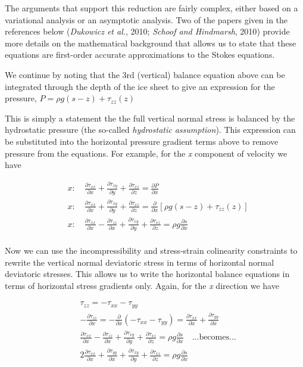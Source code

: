 The arguments that support this reduction are fairly complex, either based on a variational analysis or an asymptotic analysis. Two of the papers given in the references below ({\textit{Dukowicz et al.}, 2010}; {\textit{Schoof and Hindmarsh}, 2010}) provide more details on the mathematical background that allows us to state that these equations are first-order accurate approximations to the Stokes equations. 

We continue by noting that the 3rd (vertical) balance equation above can be integrated through the depth of the ice sheet to give an expression for the pressure, $P=\rho g\left( s-z \right)+\tau _{zz}(z)$

This is simply a statement the the full vertical normal stress is balanced by the hydrostatic pressure (the so-called \textit{hydrostatic assumption}). This expression can be substituted into the horizontal pressure gradient terms above to remove pressure from the equations. For example, for the \textit{x} component of velocity we have

\begin{align*}
  & x:\quad \frac{\partial \tau _{xx}}{\partial x}+\frac{\partial \tau _{xy}}{\partial y}+\frac{\partial \tau _{xz}}{\partial z}=\frac{\partial P}{\partial x} \\ 
 & x:\quad \frac{\partial \tau _{xx}}{\partial x}+\frac{\partial \tau _{xy}}{\partial y}+\frac{\partial \tau _{xz}}{\partial z}=\frac{\partial }{\partial x}\left[ \rho g\left( s-z \right)+\tau _{zz}(z) \right] \\ 
 & x:\quad \frac{\partial \tau _{xx}}{\partial x}-\frac{\partial \tau _{zz}}{\partial x}+\frac{\partial \tau _{xy}}{\partial y}+\frac{\partial \tau _{xz}}{\partial z}=\rho g\frac{\partial s}{\partial x} \\ 
\end{align*}

Now we can use the incompressibility and stress-strain colinearity constraints to rewrite the vertical normal deviatoric stress in terms of horizontal normal deviatoric stresses. This allows us to write the horizontal balance equations in terms of horizontal stress gradients only. Again, for the \textit{x} direction we have

\begin{align*}
  & \tau _{zz}=-\tau _{xx}-\tau _{yy} \\ 
 & -\frac{\partial \tau _{zz}}{\partial x}=-\frac{\partial }{\partial x}\left( -\tau _{xx}-\tau _{yy} \right)=\frac{\partial \tau _{xx}}{\partial x}+\frac{\partial \tau _{yy}}{\partial x} \\ 
 & \frac{\partial \tau _{xx}}{\partial x}-\frac{\partial \tau _{zz}}{\partial x}+\frac{\partial \tau _{xy}}{\partial y}+\frac{\partial \tau _{xz}}{\partial z}=\rho g\frac{\partial s}{\partial x}\quad ...\text{becomes}... \\ 
 & 2\frac{\partial \tau _{xx}}{\partial x}+\frac{\partial \tau _{yy}}{\partial x}+\frac{\partial \tau _{xy}}{\partial y}+\frac{\partial \tau _{xz}}{\partial z}=\rho g\frac{\partial s}{\partial x}\quad  \\ 
\end{align*}

